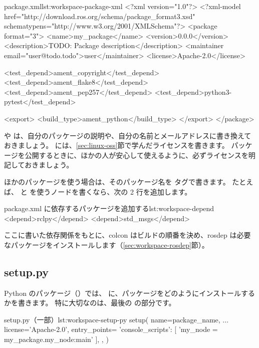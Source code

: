 \begin{codelisting}[style=xml]{package.xml}{lst:workspace-package-xml}
<?xml version="1.0"?>
<?xml-model href="http://download.ros.org/schema/package_format3.xsd" schematypens="http://www.w3.org/2001/XMLSchema"?>
<package format="3">
  <name>my_package</name>
  <version>0.0.0</version>
  <description>TODO: Package description</description>
  <maintainer email="user@todo.todo">user</maintainer>
  <license>Apache-2.0</license>

  <test_depend>ament_copyright</test_depend>
  <test_depend>ament_flake8</test_depend>
  <test_depend>ament_pep257</test_depend>
  <test_depend>python3-pytest</test_depend>

  <export>
    <build_type>ament_python</build_type>
  </export>
</package>
\end{codelisting}

 や  は、自分のパッケージの説明や、自分の名前とメールアドレスに書き換えておきましょう。
 には、\ref{sec:linux-oss}節で学んだライセンスを書きます。
パッケージを公開するときに、ほかの人が安心して使えるように、必ずライセンスを明記しておきましょう。

ほかのパッケージを使う場合は、そのパッケージ名を  タグで書きます。
たとえば、 と  を使うノードを書くなら、次の 2 行を追加します。

\begin{codelisting}[style=xml]{package.xml に依存するパッケージを追加する}{lst:workspace-depend}
  <depend>rclpy</depend>
  <depend>std_msgs</depend>
\end{codelisting}

ここに書いた依存関係をもとに、colcon はビルドの順番を決め、rosdep は必要なパッケージをインストールします（\ref{sec:workspace-rosdep}節）。

\subsection{setup.py}

Python のパッケージ（）では、 に、パッケージをどのようにインストールするかを書きます。
特に大切なのは、最後の  の部分です。

\begin{codelisting}[style=python]{setup.py（一部）}{lst:workspace-setup-py}
setup(
    name=package_name,
    ...
    license='Apache-2.0',
    entry_points={
        'console_scripts': [
            'my_node = my_package.my_node:main'
        ],
    },
)
\end{codelisting}

